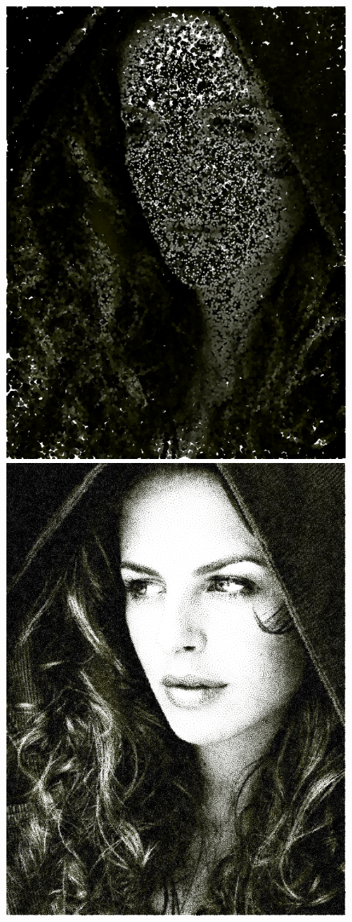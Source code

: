 \documentclass[11pt]{article}
\begin{document}
\begin{figure}[H]
\includegraphics[scale=0.4]{fairyeyes-hedcut-100000.png}
\includegraphics[scale=0.4]{fairyeyes-voronoi-100000.png}

\end{figure}
\end{document}
